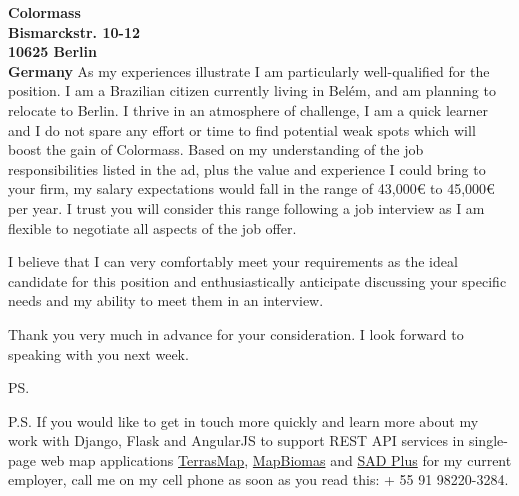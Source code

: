 \documentclass[a4paper]{joaosoares-letter}
\begin{document}
\begin{letter}{\bfseries Colormass\\Bismarckstr. 10-12\\10625 Berlin\\Germany}
As my experiences illustrate I am particularly well-qualified for the position. I am a Brazilian citizen currently living in Belém, and am planning to relocate to Berlin. I thrive in an atmosphere of challenge, I am a quick learner and I do not spare any effort or time to find potential weak spots which will boost the gain of Colormass. Based on my understanding of the job responsibilities listed in the ad, plus the value and experience I could bring to your firm, my salary expectations would fall in the range of 43,000€ to 45,000€ per year. I trust you will consider this range following a job interview as I am flexible to negotiate all aspects of the job offer.

I believe that I can very comfortably meet your requirements as the ideal candidate for this position and enthusiastically anticipate discussing your specific needs and my ability to meet them in an interview.

\closing{Thank you very much in advance for your consideration. I look forward to speaking with you next week.}
\vspace{10pt}
\ps

P.S. If you would like to get in touch more quickly and learn more about my work with Django, Flask and AngularJS to support REST API services in single-page web map applications \href{https://goo.gl/6gUzPA}{TerrasMap}, \href{https://goo.gl/eYX5SW}{MapBiomas} and \href{https://goo.gl/2J41hR}{SAD Plus} for my current employer, call me on my cell phone as soon as you read this: + 55 91 98220-3284.
\vspace{\fill}

\end{letter}
\end{document}
